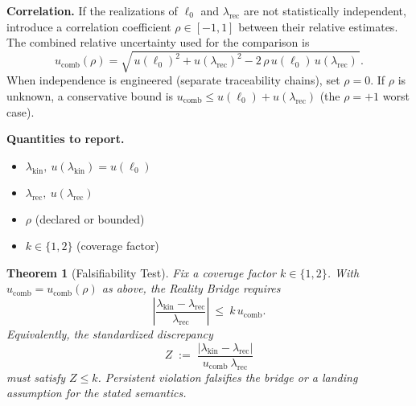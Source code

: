 \documentclass[11pt]{article}
\theoremstyle{plain}
\newtheorem{theorem}{Theorem}
\theoremstyle{definition}
\theoremstyle{remark}
\begin{document}
\medskip
\noindent\textbf{Correlation.} If the realizations of \(\ell_{0}\) and \(\lambda_{\mathrm{rec}}\) are not statistically independent, introduce a correlation coefficient \(\rho\in[-1,1]\) between their relative estimates. The combined relative uncertainty used for the comparison is
\[
u_{\mathrm{comb}}(\rho)
=\sqrt{\,u(\ell_{0})^{2}+u(\lambda_{\mathrm{rec}})^{2}-2\,\rho\,u(\ell_{0})\,u(\lambda_{\mathrm{rec}})\,}.
\]
When independence is engineered (separate traceability chains), set \(\rho=0\). If \(\rho\) is unknown, a conservative bound is \(u_{\mathrm{comb}}\le u(\ell_{0})+u(\lambda_{\mathrm{rec}})\) (the \(\rho=+1\) worst case).

\medskip
\noindent\textbf{Quantities to report.}
\begin{itemize}
  \item $\lambda_{\mathrm{kin}},\ u(\lambda_{\mathrm{kin}})=u(\ell_{0})$
  \item $\lambda_{\mathrm{rec}},\ u(\lambda_{\mathrm{rec}})$
  \item $\rho$ (declared or bounded)
  \item $k \in \{1,2\}$ (coverage factor)
\end{itemize}

\begin{theorem}[Falsifiability Test]
Fix a coverage factor \(k\in\{1,2\}\). With \(u_{\mathrm{comb}}=u_{\mathrm{comb}}(\rho)\) as above, the Reality Bridge requires
\[
\left|\frac{\lambda_{\mathrm{kin}}-\lambda_{\mathrm{rec}}}{\lambda_{\mathrm{rec}}}\right|
\ \le\ 
k\,u_{\mathrm{comb}}.
\]
Equivalently, the standard\-ized discrepancy
\[
Z\;:=\;\frac{|\lambda_{\mathrm{kin}}-\lambda_{\mathrm{rec}}|}{u_{\mathrm{comb}}\ \lambda_{\mathrm{rec}}}
\]
must satisfy \(Z\le k\). Persistent violation falsifies the bridge or a landing assumption for the stated semantics.
\end{theorem}
\end{document}
